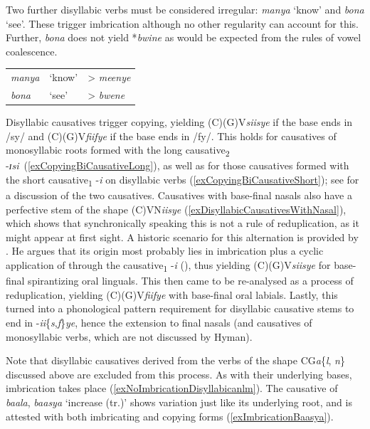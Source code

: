 Two further disyllabic verbs must be considered irregular: \textit{manya} \lq know' and \textit{bona} \lq see'. These trigger imbrication although no other regularity can account for this. Further, \textit{bona} does not yield *\textit{bwine} as would be expected from the rules of vowel coalescence.
\begin{exe}
\ex
\begin{tabular}[t]{@{}>{\itshape}lll}
\textit{manya} &`know' & > \textit{meenye}
\\\textit{bona} & `see' & > \textit{bwene}
\end{tabular}
\end{exe}

Disyllabic causatives trigger copying, yielding (C)(G)V\textit{siisye} if the base ends in /sy/ and (C)(G)V\textit{fiifye} if the base ends in /fy/. This holds for causatives of monosyllabic roots formed with the long causative\textsubscript{2} \mbox{-\textit{ɪsi} }(\ref{exCopyingBiCausativeLong}), as well as for those causatives formed with the short causative\textsubscript{1} \mbox{-\textit{i}} on disyllabic verbs (\ref{exCopyingBiCausativeShort}); see  for a discussion of the two causatives. Causatives with base-final nasals also have a perfective stem of the shape (C)VN\textit{iisye} (\ref{exDisyllabicCausativesWithNasal}), which shows that synchronically speaking this is not a rule of reduplication, as it might appear at first sight. A historic scenario for this alternation is provided by \citet{HymanL2003b}. He argues that its origin most probably lies in imbrication plus a cyclic application of  through the causative\textsubscript{1} -\textit{i} (), thus yielding (C)(G)V\textit{siisye} for base-final spirantizing oral linguals. This then came to be re-analysed as a process of reduplication, yielding (C)(G)V\textit{fiifye} with base-final oral labials. Lastly, this turned into a phonological pattern requirement for disyllabic causative stems to end in -\textit{ii}\{\textit{s},\textit{f}\}\textit{ye}, hence the extension to final nasals (and causatives of monosyllabic verbs, which are not discussed by Hyman).

Note that disyllabic causatives derived from the verbs of the shape CG\textit{a}\{\textit{l}, \textit{n}\} discussed above are excluded from this process. As with their underlying bases, imbrication takes place (\ref{exNoImbricationDisyllabicanlm}). The causative of \textit{baala}, \textit{baasya} \lq increase (tr.)' shows variation just like its underlying root, and is attested with both imbricating and copying forms (\ref{exImbricationBaasya}).

